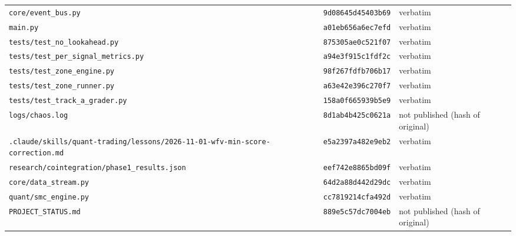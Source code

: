 {\begin{longtable}{@{}>{\raggedright\arraybackslash}p{8.6cm}p{2.7cm}>{\raggedright\arraybackslash}p{3.4cm}@{}}
\texttt{core/\allowbreak{}event\_bus.py} & \texttt{9d08645d45403b69} & verbatim \\
\texttt{main.py} & \texttt{a01eb656a6ec7efd} & verbatim \\
\texttt{tests/\allowbreak{}test\_no\_lookahead.py} & \texttt{875305ae0c521f07} & verbatim \\
\texttt{tests/\allowbreak{}test\_per\_signal\_metrics.py} & \texttt{a94e3f915c1fdf2c} & verbatim \\
\texttt{tests/\allowbreak{}test\_zone\_engine.py} & \texttt{98f267fdfb706b17} & verbatim \\
\texttt{tests/\allowbreak{}test\_zone\_runner.py} & \texttt{a63e42e396c270f7} & verbatim \\
\texttt{tests/\allowbreak{}test\_track\_a\_grader.py} & \texttt{158a0f665939b5e9} & verbatim \\
\texttt{logs/\allowbreak{}chaos.log} & \texttt{8d1ab4b425c0621a} & not published (hash of original) \\
\texttt{.claude/\allowbreak{}skills/\allowbreak{}quant-\allowbreak{}trading/\allowbreak{}lessons/\allowbreak{}2026-\allowbreak{}11-\allowbreak{}01-\allowbreak{}wfv-\allowbreak{}min-\allowbreak{}score-\allowbreak{}correction.md} & \texttt{e5a2397a482e9eb2} & verbatim \\
\texttt{research/\allowbreak{}cointegration/\allowbreak{}phase1\_results.json} & \texttt{eef742e8865bd09f} & verbatim \\
\texttt{core/\allowbreak{}data\_stream.py} & \texttt{64d2a88d442d29dc} & verbatim \\
\texttt{quant/\allowbreak{}smc\_engine.py} & \texttt{cc7819214cfa492d} & verbatim \\
\texttt{PROJECT\_STATUS.md} & \texttt{889e5c57dc7004eb} & not published (hash of original) \\
\bottomrule
\end{longtable}
}
